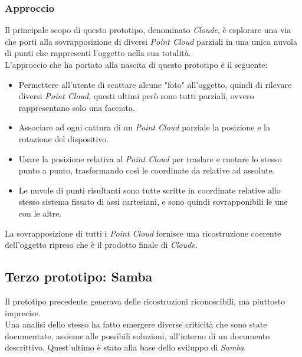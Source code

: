 \subsubsection{Approccio}
Il principale scopo di questo prototipo, denominato \emph{Cloude}, è esplorare una via che porti alla sovrapposizione di diversi \emph{Point Cloud} parziali in una unica nuvola di punti che rappresenti l'oggetto nella sua totalità.\\
L'approccio che ha portato alla nascita di questo prototipo è il seguente:
\begin{itemize}
	\item Permettere all'utente di scattare alcune "foto" all'oggetto, quindi di rilevare diversi \emph{Point Cloud}, questi ultimi però sono tutti parziali, ovvero rappresentano solo una facciata.
	\item Associare ad ogni cattura di un \emph{Point Cloud} parziale la posizione e la rotazione del dispositivo.
	\item Usare la posizione relativa al \emph{Point Cloud} per traslare e ruotare lo stesso punto a punto, trasformando così le coordinate da relative ad assolute.
	\item Le nuvole di punti risultanti sono tutte scritte in coordinate relative allo stesso sistema fissato di assi cartesiani, e sono quindi sovrapponibili le une con le altre.
\end{itemize}
La sovrapposizione di tutti i \emph{Point Cloud} fornisce una ricostruzione coerente dell'oggetto ripreso che è il prodotto finale di \emph{Cloude}.

\subsection{Terzo prototipo: Samba}
Il prototipo precedente generava delle ricostruzioni riconoscibili, ma piuttosto imprecise.\\
Una analisi dello stesso ha fatto emergere diverse criticità che sono state documentate, assieme alle possibili soluzioni, all'interno di un documento descrittivo. Quest'ultimo è stato alla base dello sviluppo di \emph{Samba}.
